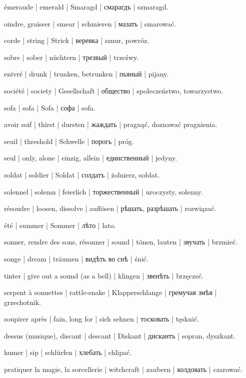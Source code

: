 \begin{outdent}{1em}
émeraude | emerald | Smaragd | смарагдъ | szmaragd.

oindre, graisser | smear | schmieren | мазать | smarować.

corde | string | Strick | веревка | sznur, powróz.

sobre | sober | nüchtern | трезвый | trzeźwy.

\uvsubentry{}
enivré | drunk | trunken, betrunken | пьяный | pijany.

société | society | Gesellschaft | общество | społeczeństwo,
towarzystwo.

sofa | sofa | Sofa | софа | sofa.

avoir soif | thirst | dursten | жаждать | pragnąć, doznawać
pragnienia.

seuil | threshold | Schwelle | порогь | próg.

seul | only, alone | einzig, allein | единственный | jedyny.

soldat | soldier | Soldat | солдатъ | żolnierz, sołdat.

solennel | solemn | feierlich | торжественный | uroczysty, solenny.

résoudre | loosen, dissolve | auflösen | рѣшать, разрѣшать | rozwiązać.

été | summer | Sommer | лѣто | lato.

sonner, rendre des sons, résonner | sound | tönen, lauten | звучать | brzmieć.

songe | dream | träumen | видѣть во снѣ | śnić.

tinter | give out a sound (as a bell) | klingen | звенѣть | brzęczeć.

serpent à sonnettes | rattle-snake | Klapperschlange | гремучая змѣя | grzechotnik.

soupirer après | fain, long for | sich sehnen | тосковать | tęsknić.

dessus (musique), discant | descant | Diskant | дискантъ | sopran, dyszkant.

humer | sip | schlürfen | хлебать | chlipać.

pratiquer la magie, la sorcellerie | witchcraft | zaubern | колдовать | czarować.


\end{outdent}
